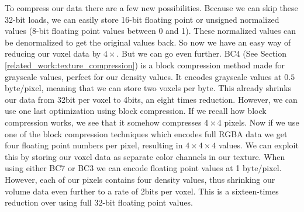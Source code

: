 To compress our data there are a few new possibilities. Because we can skip these 32-bit loads, we can easily store 16-bit floating point or unsigned normalized values (8-bit floating point values between 0 and 1). These normalized values can be denormalized to get the original values back. So now we have an easy way of reducing our voxel data by $4\times$. But we can go even further. BC4 (See Section \ref{related_work:texture_compression}) is a block compression method made for grayscale values, perfect for our density values. It encodes grayscale values at $0.5$ byte/pixel, meaning that we can store two voxels per byte. This already shrinks our data from 32bit per voxel to 4bits, an eight times reduction. However, we can use one last optimization using block compression. If we recall how block compression works, we see that it somehow compresses $4\times 4$ pixels. Now if we use one of the block compression techniques which encodes full RGBA data we get four floating point numbers per pixel, resulting in $4 \times 4 \times 4$ values. We can exploit this by storing our voxel data as separate color channels in our texture. When using either BC7 or BC3 we can encode floating point values at 1 byte/pixel. However, each of our pixels contains four density values, thus shrinking our volume data even further to a rate of 2bits per voxel. This is a sixteen-times reduction over using full 32-bit floating point values.

